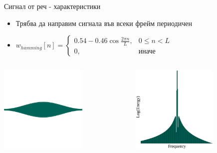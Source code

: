 \documentclass[9pt]{beamer}
\begin{document}
    \begin{frame}[t]{Сигнал от реч - характеристики}
        \pause
        \begin{itemize}
            \item Трябва да направим сигнала във всеки фрейм периодичен
            \pause
            \item $w_{hamming}[n] = \begin{cases} 
                0.54 - 0.46 \cos{\frac{2\pi n}{L}}, & 0\leq n < L \\
                0, & \text{иначе}
            \end{cases}$
        \end{itemize}
        \pause
        \begin{columns}[t]
            \begin{column}{0.48\textwidth}
                \includegraphics[width=0.65\textwidth]{ham.png} 
            \end{column}
            \hfill
            \begin{column}{0.48\textwidth}
                \includegraphics[width=0.65\textwidth]{ham_coef.png} 

\end{column}
\end{columns}
\end{frame}
\end{document}

